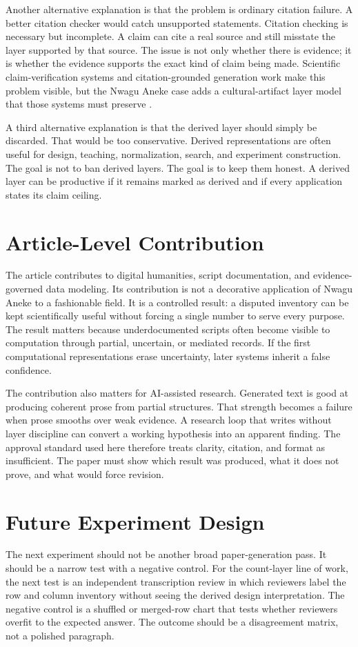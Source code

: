 \documentclass[sigconf,nonacm]{acmart}
\begin{document}
Another alternative explanation is that the problem is ordinary citation
failure. A better citation checker would catch unsupported statements. Citation
checking is necessary but incomplete. A claim can cite a real source and still
misstate the layer supported by that source. The issue is not only whether there
is evidence; it is whether the evidence supports the exact kind of claim being
made. Scientific claim-verification systems and citation-grounded generation
work make this problem visible, but the Nwagu Aneke case adds a cultural-artifact
layer model that those systems must preserve \cite{wadden2020scifact,gao2023alce}.

A third alternative explanation is that the derived layer should simply be
discarded. That would be too conservative. Derived representations are often
useful for design, teaching, normalization, search, and experiment construction.
The goal is not to ban derived layers. The goal is to keep them honest. A
derived layer can be productive if it remains marked as derived and if every
application states its claim ceiling.

\section{Article-Level Contribution}
The article contributes to digital humanities, script documentation, and evidence-governed data modeling. Its contribution is not a decorative
application of Nwagu Aneke to a fashionable field. It is a controlled result:
a disputed inventory can be kept scientifically useful without forcing a single number to serve every purpose. The result matters because underdocumented scripts often become
visible to computation through partial, uncertain, or mediated records. If the
first computational representations erase uncertainty, later systems inherit a
false confidence.

The contribution also matters for AI-assisted research. Generated text is good
at producing coherent prose from partial structures. That strength becomes a
failure when prose smooths over weak evidence. A research loop that writes
without layer discipline can convert a working hypothesis into an apparent
finding. The approval standard used here therefore treats clarity, citation, and
format as insufficient. The paper must show which result was produced, what it
does not prove, and what would force revision.

\section{Future Experiment Design}
The next experiment should not be another broad paper-generation pass. It should
be a narrow test with a negative control. For the count-layer line of work, the
next test is an independent transcription review in which reviewers label the
row and column inventory without seeing the derived design interpretation. The
negative control is a shuffled or merged-row chart that tests whether reviewers
overfit to the expected answer. The outcome should be a disagreement matrix,
not a polished paragraph.
\end{document}
